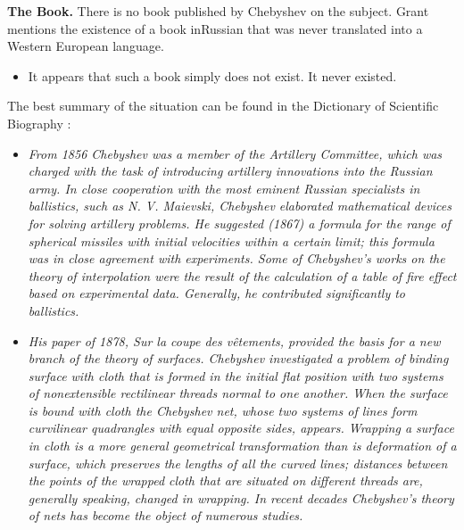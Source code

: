 \documentclass[12pt]{article}
\begin{document}
{\bf The Book.} There is no book published by Chebyshev on the subject. Grant mentions the existence of a book inRussian that was never translated into a Western European language.

\begin{itemize}

\item[$\bullet$]It appears that such a book simply does not exist. It never existed.

\end{itemize}

The best summary of the situation can be found in the Dictionary of Scientific Biography \cite{Youschkevitch1970}:

\begin{itemize}

\item[]{\it From 1856 Chebyshev was a member of the Artillery Committee, which was charged with the task of introducing artillery innovations into the Russian army. In close cooperation with the most eminent Russian specialists in ballistics, such as N. V. Maievski, Chebyshev elaborated mathematical devices for solving artillery problems. He suggested (1867) a formula for the range of spherical missiles with initial velocities within a certain limit; this formula was in close agreement with experiments. Some of Chebyshev's works on the theory of interpolation were the result of the calculation of a table of fire effect based on experimental data. Generally, he contributed significantly to ballistics.}

\item[]{\it His paper of 1878, {\sc Sur la coupe des v\^etements}, provided the basis for a new branch of the theory of surfaces. Chebyshev investigated a problem of binding surface with cloth that is formed in the initial flat position with two systems of nonextensible rectilinear threads normal to one another. When the surface is bound with cloth the {\sc Chebyshev net}, whose two systems of lines form curvilinear quadrangles with equal opposite sides, appears. Wrapping a surface in cloth is a more general geometrical transformation than is deformation of a surface, which preserves the lengths of all the curved lines; distances between the points of the wrapped cloth that are situated on different threads are, generally speaking, changed in wrapping. In recent decades Chebyshev's theory of nets has become the object of numerous studies.}

\end{itemize}
\end{document}
